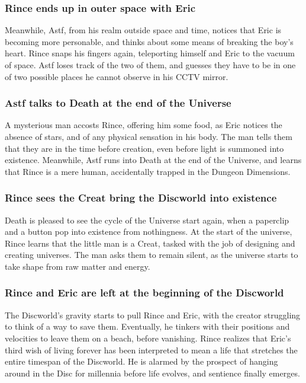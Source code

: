 \subsubsection{\Gls{Rince} ends up in outer space with \Gls{Eric}}
Meanwhile, \Gls{Astf}, from his realm outside space and time, notices that \Gls{Eric} is becoming
more personable, and thinks about some means of breaking the boy's heart. \Gls{Rince} snaps his
fingers again, teleporting himself and \Gls{Eric} to the vacuum of space. \Gls{Astf} loses track
of the two of them, and guesses they have to be in one of two possible places he cannot observe in
his CCTV mirror.

\subsubsection{\Gls{Astf} talks to \Gls{Death} at the end of the Universe}
A mysterious man accosts \Gls{Rince}, offering him some food, as \Gls{Eric} notices the absence of
stars, and of any physical sensation in his body. The man tells them that they are in the time
before creation, even before light is summoned into existence. Meanwhile, \Gls{Astf} runs into
\Gls{Death} at the end of the Universe, and learns that \Gls{Rince} is a mere human, accidentally
trapped in the Dungeon Dimensions.

\subsubsection{\Gls{Rince} sees the \Gls{Creat} bring the Discworld into existence}
\Gls{Death} is pleased to see the cycle of the Universe start again, when a paperclip and a button
pop into existence from nothingness. At the start of the universe, \Gls{Rince} learns that the
little man is a \Gls{Creat}, tasked with the job of designing and creating universes. The man asks
them to remain silent, as the universe starts to take shape from raw matter and energy.

\subsubsection{\Gls{Rince} and \Gls{Eric} are left at the beginning of the Discworld}
The Discworld's gravity starts to pull \Gls{Rince} and \Gls{Eric}, with the creator struggling to
think of a way to save them. Eventually, he tinkers with their positions and velocities to leave
them on a beach, before vanishing. \Gls{Rince} realizes that \Gls{Eric}'s third wish of living
forever has been interpreted to mean a life that stretches the entire timespan of the Discworld. He
is alarmed by the prospect of hanging around in the Disc for millennia before life evolves, and
sentience finally emerges.


